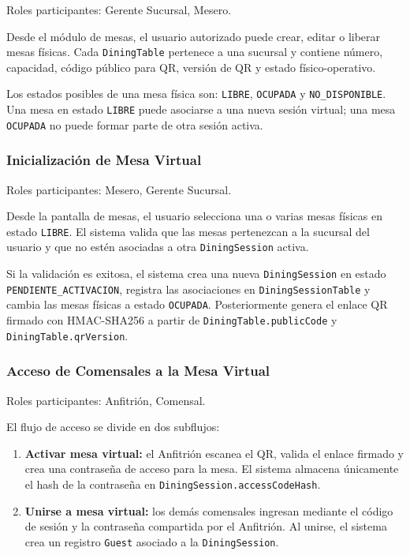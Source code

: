 Roles participantes: Gerente Sucursal, Mesero.

Desde el módulo de mesas, el usuario autorizado puede crear, editar o liberar mesas
físicas. Cada \texttt{DiningTable} pertenece a una sucursal y contiene número, capacidad,
código público para QR, versión de QR y estado físico-operativo.

Los estados posibles de una mesa física son: \texttt{LIBRE}, \texttt{OCUPADA} y
\texttt{NO\_DISPONIBLE}. Una mesa en estado \texttt{LIBRE} puede asociarse a una nueva
sesión virtual; una mesa \texttt{OCUPADA} no puede formar parte de otra sesión activa.

\subsubsection{Inicialización de Mesa Virtual}

Roles participantes: Mesero, Gerente Sucursal.

Desde la pantalla de mesas, el usuario selecciona una o varias mesas físicas en estado
\texttt{LIBRE}. El sistema valida que las mesas pertenezcan a la sucursal del usuario y
que no estén asociadas a otra \texttt{DiningSession} activa.

Si la validación es exitosa, el sistema crea una nueva \texttt{DiningSession} en estado
\texttt{PENDIENTE\_ACTIVACION}, registra las asociaciones en \texttt{DiningSessionTable}
y cambia las mesas físicas a estado \texttt{OCUPADA}. Posteriormente genera el enlace QR
firmado con HMAC-SHA256 a partir de \texttt{DiningTable.publicCode} y
\texttt{DiningTable.qrVersion}.

\subsubsection{Acceso de Comensales a la Mesa Virtual}

Roles participantes: Anfitrión, Comensal.

El flujo de acceso se divide en dos subflujos:

\begin{enumerate}[leftmargin=1.5em]
  \item \textbf{Activar mesa virtual:} el Anfitrión escanea el QR, valida el enlace
  firmado y crea una contraseña de acceso para la mesa. El sistema almacena únicamente
  el hash de la contraseña en \texttt{DiningSession.accessCodeHash}.

  \item \textbf{Unirse a mesa virtual:} los demás comensales ingresan mediante el código
  de sesión y la contraseña compartida por el Anfitrión. Al unirse, el sistema crea un
  registro \texttt{Guest} asociado a la \texttt{DiningSession}.
\end{enumerate}

